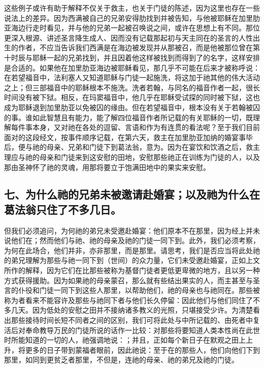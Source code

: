 这些例子或许有助于解释不仅关于救主，也关于门徒的陈述，因为这里也存在一些说法上的差异。因为西满被自己的兄弟安得肋找到并被告知，与他被耶稣在加里肋亚海边行走时看见，并与他的兄弟一起被召唤说之间，或许在思想上有不同。那位更深入根源、讲述圣言降生成人、因而没有记载那起初与天主同在的圣言的人性出生的作者，不应当告诉我们西满是在海边被发现并从那被召，而是他被那位曾在第十时辰与耶稣一起的兄弟找到，并且因着他这样被找到而得到了的名字，这样安排是合适的。如果他在加里肋亚海边被耶稣看见，那几乎不可能在后来才被称呼说：在若望福音中，法利塞人又知道耶稣与门徒一起施洗，将这加于祂其他的伟大活动之上；但三部福音中的耶稣根本不施洗。洗者若翰，与同名的福音作者一起，很长时间没有被下狱。相反，在玛窦福音中，他几乎在耶稣受试探的同时被下狱，这也成为耶稣退到加里肋亚以免被囚的缘由。但在若望福音中，根本没有关于若翰被囚的事。谁如此智慧且有能力，能了解四位福音作者所记载的有关耶稣的一切，既理解每件事本身，又对祂在各处的逗留、言语和作为有连贯的看法呢？至于我们目前面对的这段经文，按事件顺序记载，在第六天，救主在加里肋亚加纳的婚宴事毕后，便与祂的母亲、兄弟和门徒下到葛法翁，意为。因为在宴饮和饮酒之后，救主理应与祂的母亲和门徒来到这安慰的田地，安慰那些祂正在训练为门徒的人，以及那由圣神怀了祂的灵魂，用那将要立于饱满田地中的果实来安慰。\par


\subsection{七、为什么祂的兄弟未被邀请赴婚宴；以及祂为什么在葛法翁只住了不多几日。}

但我们必须追问，为何祂的弟兄未受邀赴婚宴：他们原本不在那里，因为经上并未说他们在；然而他们与祂、祂的母亲及祂的门徒一同下到。此外，我们必须考察，为何在此场合，他们并非，亦非那里，而是那里。请思考，我们是否应当将此处祂的弟兄理解为那些与祂一同下到（世间）的众力量，它们未受邀赴婚宴，正如上文所作的解释，因为它们在比那些被称为基督门徒者更低更卑微的地方，且以另一种方式获得援助。因为如果祂的母亲蒙召，那么就有些结出果实的人，而主甚至与圣言的仆役和门徒一同下到这些人那里，以帮助他们，祂的母亲也与祂同在。那些被称为者看来不能容许及那些与祂同下者与他们长久停留：因此他们与他们同住了不多几天。因为低处的安慰之田并不接纳诸多教义的光照，只堪接受少许。为清楚看出那些接待时间长短不同者之间的区别，我们可将此处与中所记载的、由死者中复活后对奉命教导万民的门徒所说的话作一比较：对那些将要知道人类本性尚在此世时所能知道的一切的人，祂强调地说：；并且，正如每个新日子在默观之田上上升，将更多的日子带到蒙福者眼前，因此祂说：至于在的那些人，他们向他们下到那里，如同到更贫乏者那里，不但是，连祂的母亲、祂的弟兄及祂的门徒。\par

